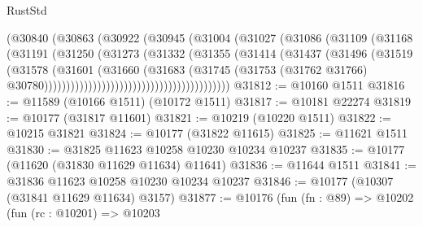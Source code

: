 \begin{lexlean}{RustStd}
\begin{coremodule}
                                        (@30840
                                          (@30863
                                            (@30922
                                              (@30945
                                                (@31004
                                                  (@31027
                                                    (@31086
                                                      (@31109
                                                        (@31168
                                                          (@31191
                                                            (@31250
                                                              (@31273
                                                                (@31332
                                                                  (@31355
                                                                    (@31414
                                                                      (@31437
                                                                        (@31496
                                                                          (@31519
                                                                            (@31578
                                                                              (@31601
                                                                                (@31660
                                                                                  (@31683
                                                                                    (@31745
                                                                                      (@31753
                                                                                        (@31762
                                                                                          @31766)
                                                                                        @30780))))))))))))))))))))))))))))))))))))))))))
@31812 := @10160 @1511
@31816 := @11589 (@10166 @1511) (@10172 @1511)
@31817 := @10181 @22274
@31819 := @10177 (@31817 @11601)
@31821 := @10219 (@10220 @1511)
@31822 := @10215 @31821
@31824 := @10177 (@31822 @11615)
@31825 := @11621 @1511
@31830 := @31825 @11623 @10258 @10230 @10234 @10237
@31835 := @10177 (@11620 (@31830 @11629 @11634) @11641)
@31836 := @11644 @1511
@31841 := @31836 @11623 @10258 @10230 @10234 @10237
@31846 := @10177 (@10307 (@31841 @11629 @11634) @3157)
@31877 := @10176
    (fun (fn : @89) =>
    @10202
      (fun (rc : @10201) =>
      @10203

\end{coremodule}
\end{lexlean}
